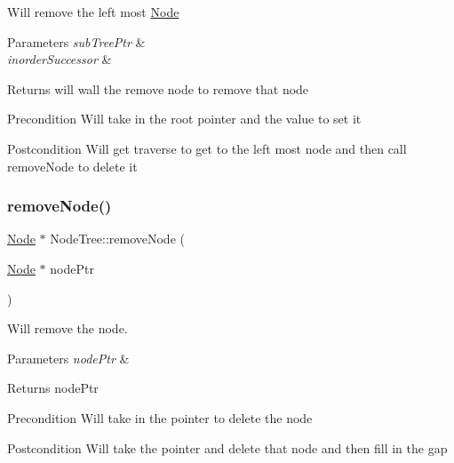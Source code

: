Will remove the left most \mbox{\hyperlink{class_node}{Node}} 
\begin{DoxyParams}{Parameters}
{\em sub\+Tree\+Ptr} & \\
\hline
{\em inorder\+Successor} & \\
\hline
\end{DoxyParams}
\begin{DoxyReturn}{Returns}
will wall the remove node to remove that node 
\end{DoxyReturn}
\begin{DoxyPrecond}{Precondition}
Will take in the root pointer and the value to set it 
\end{DoxyPrecond}
\begin{DoxyPostcond}{Postcondition}
Will get traverse to get to the left most node and then call remove\+Node to delete it 
\end{DoxyPostcond}
\mbox{\label{class_node_tree_a68eae12d4ddd719e761e9e96211c8568}} 
\subsubsection{\texorpdfstring{remove\+Node()}{removeNode()}}
{\footnotesize\ttfamily \mbox{\hyperlink{class_node}{Node}} $\ast$ Node\+Tree\+::remove\+Node (\begin{DoxyParamCaption}\item[{\mbox{\hyperlink{class_node}{Node}} $\ast$}]{node\+Ptr }\end{DoxyParamCaption})\hspace{0.3cm}{\ttfamily [protected]}}



Will remove the node. 


\begin{DoxyParams}{Parameters}
{\em node\+Ptr} & \\
\hline
\end{DoxyParams}
\begin{DoxyReturn}{Returns}
node\+Ptr 
\end{DoxyReturn}
\begin{DoxyPrecond}{Precondition}
Will take in the pointer to delete the node 
\end{DoxyPrecond}
\begin{DoxyPostcond}{Postcondition}
Will take the pointer and delete that node and then fill in the gap 
\end{DoxyPostcond}
\mbox{\label{class_node_tree_a5f976e7369dcc91276df40678b59c33c}} 
